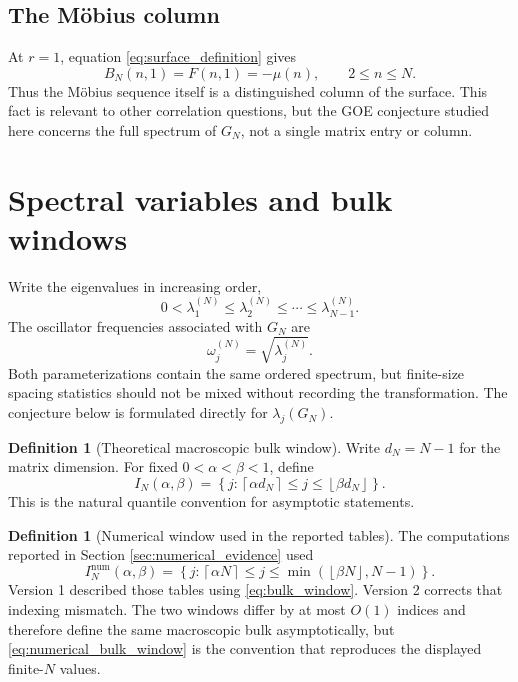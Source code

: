 \documentclass[11pt]{amsart}
\numberwithin{equation}{section}
\theoremstyle{plain}
\theoremstyle{definition}
\newtheorem{definition}[theorem]{Definition}
\theoremstyle{remark}
\newcommand{\mob}{\mu}
\begin{document}
\subsection{The M\"obius column}
\label{subsec:mobius_column}

At $r=1$, equation \eqref{eq:surface_definition} gives
\begin{equation}
B_N(n,1)=F(n,1)=-\mob(n),
\qquad 2\le n\le N.
\label{eq:first_column_mobius}
\end{equation}
Thus the M\"obius sequence itself is a distinguished column of the surface.  This fact is relevant to other correlation questions, but the GOE conjecture studied here concerns the full spectrum of $G_N$, not a single matrix entry or column.

\section{Spectral variables and bulk windows}
\label{sec:spectral_variables}

Write the eigenvalues in increasing order,
\begin{equation}
0<\lambda_1^{(N)}\le\lambda_2^{(N)}\le\cdots\le\lambda_{N-1}^{(N)}.
\label{eq:eigenvalue_order}
\end{equation}
The oscillator frequencies associated with $G_N$ are
\begin{equation}
\omega_j^{(N)}=\sqrt{\lambda_j^{(N)}}.
\label{eq:oscillator_frequency}
\end{equation}
Both parameterizations contain the same ordered spectrum, but finite-size spacing statistics should not be mixed without recording the transformation.  The conjecture below is formulated directly for $\lambda_j(G_N)$.

\begin{definition}[Theoretical macroscopic bulk window]
\label{def:bulk_window}
Write $d_N=N-1$ for the matrix dimension.  For fixed $0<\alpha<\beta<1$, define
\begin{equation}
I_N(\alpha,\beta)
=
\left\{j:\left\lceil\alpha d_N\right\rceil
\le j\le
\left\lfloor\beta d_N\right\rfloor\right\}.
\label{eq:bulk_window}
\end{equation}
This is the natural quantile convention for asymptotic statements.
\end{definition}

\begin{definition}[Numerical window used in the reported tables]
\label{def:numerical_bulk_window}
The computations reported in Section \ref{sec:numerical_evidence} used
\begin{equation}
I_N^{\mathrm{num}}(\alpha,\beta)
=
\left\{j:\left\lceil\alpha N\right\rceil
\le j\le
\min\!\left(\left\lfloor\beta N\right\rfloor,N-1\right)\right\}.
\label{eq:numerical_bulk_window}
\end{equation}
Version 1 described those tables using \eqref{eq:bulk_window}.  Version 2 corrects that indexing mismatch.  The two windows differ by at most $O(1)$ indices and therefore define the same macroscopic bulk asymptotically, but \eqref{eq:numerical_bulk_window} is the convention that reproduces the displayed finite-$N$ values.
\end{definition}
\end{document}
